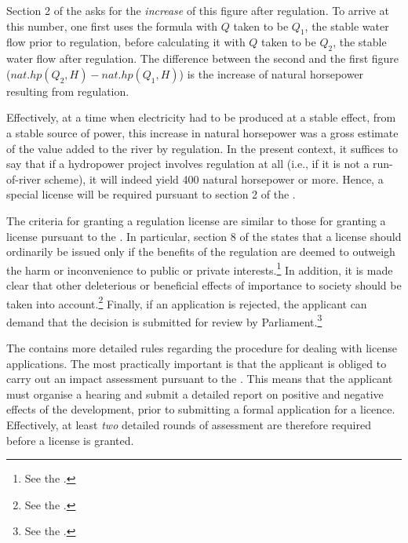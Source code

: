Section 2 of the \cite{wra17} asks for the {\it increase} of this figure after regulation. To arrive at this number, one first uses the formula with $Q$ taken to be $Q_1$, the stable water flow prior to regulation, before calculating it with $Q$ taken to be $Q_2$, the stable water flow after regulation. The difference between the second and the first figure ($nat.hp(Q_2,H) - nat.hp(Q_1,H)$) is the increase of natural horsepower resulting from regulation.

Effectively, at a time when electricity had to be produced at a stable effect, from a stable source of power, this increase in natural horsepower was a gross estimate of the value added to the river by regulation. In the present context, it suffices to say that if a hydropower project involves regulation at all (i.e., if it is not a run-of-river scheme), it will indeed yield 400 natural horsepower or more. Hence, a special license will be required pursuant to section 2 of the \cite{wra17}. 

The criteria for granting a regulation license are similar to those for granting a license pursuant to the \cite{wra00}. In particular, section 8 of the \cite{wra17} states that a license should ordinarily be issued only if the benefits of the regulation are deemed to outweigh the harm or inconvenience to public or private interests.\footnote{See the \dni\cite[8]{wra17}.} In addition, it is made clear that other deleterious or beneficial effects of importance to society should be taken into account.\footnote{See the \dni\cite[8]{wra17}.} Finally, if an application is rejected, the applicant can demand that the decision is submitted for review by Parliament.\footnote{See the \dni\cite[8]{wra17}.}

The \cite{wra17} contains more detailed rules regarding the procedure for dealing with license applications. The most practically important is that the applicant is obliged to carry out an impact assessment pursuant to the \cite{pb08}. This means that the applicant must organise a hearing and submit a detailed report on positive and negative effects of the development, prior to submitting a formal application for a licence. Effectively, at least {\it two} detailed rounds of assessment are therefore required before a license is granted.

